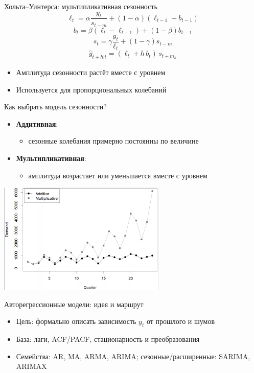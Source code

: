 \documentclass[aspectratio=1610,12pt]{beamer}
\begin{document}
    \begin{frame}{Хольта–Уинтерса: мультипликативная сезонность}
\[
\ell_t=\alpha \frac{y_t}{s_{t-m}} + (1-\alpha)(\ell_{t-1}+b_{t-1})
\]
\[
b_t=\beta(\ell_t-\ell_{t-1}) + (1-\beta)b_{t-1}
\]
\[
s_t=\gamma \frac{y_t}{\ell_t} + (1-\gamma)s_{t-m}
\]
\[
\hat y_{t+h|t}=(\ell_t + h\,b_t)\,s_{t+m_h}
\]
\begin{itemize}
    \item Амплитуда сезонности растёт вместе с уровнем
    \item Используется для пропорциональных колебаний
\end{itemize}
\end{frame}


    \begin{frame}{Как выбрать модель сезонности?}
\begin{itemize}
    \item \textbf{Аддитивная}:
    \begin{itemize}
        \item сезонные колебания примерно постоянны по величине
    \end{itemize}
    \item \textbf{Мультипликативная}:
    \begin{itemize}
        \item амплитуда возрастает или уменьшается вместе с уровнем
    \end{itemize}
\end{itemize}
\centering
\includegraphics[width=0.6\textwidth]{additive_vs_multiplicative.png}
\end{frame}



\begin{frame}{Авторегрессионные модели: идея и маршрут}
\begin{itemize}
  \item Цель: формально описать зависимость $y_t$ от прошлого и шумов
  \item База: лаги, ACF/PACF, стационарность и преобразования
  \item Семейства: AR, MA, ARMA, ARIMA; сезонные/расширенные: SARIMA, ARIMAX
\end{itemize}
\end{frame}
\end{document}
